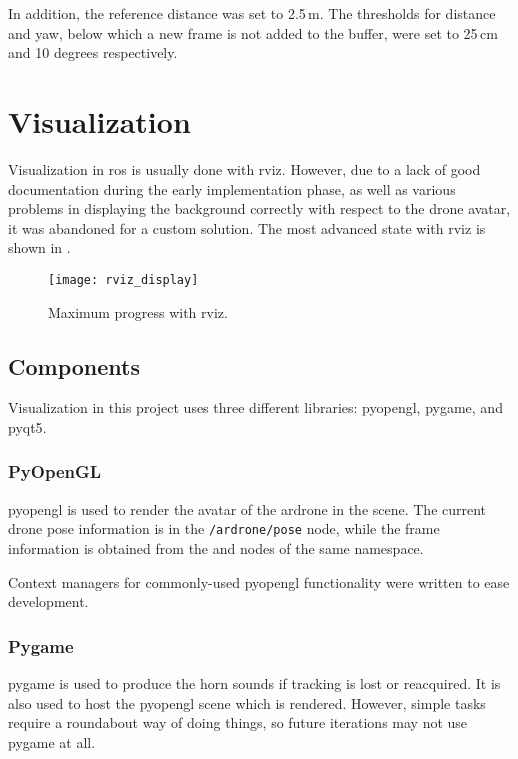      In addition, the reference distance was set to 2.5\,m.
      The thresholds for distance and yaw, below which a new frame is not added to the buffer, were set to 25\,cm and 10 degrees respectively.

\chapter{Visualization}
  Visualization in \gls{ros} is usually done with \gls{rviz}.
  However, due to a lack of good documentation during the early implementation phase, as well as various problems in displaying the background correctly with respect to the drone avatar, it was abandoned for a custom solution.
  The most advanced state with \gls{rviz} is shown in .

  \begin{figure}[h]
    \centering
    \texttt{[image: rviz\_display]}
    \caption[rviz maximum progress]{Maximum progress with \gls{rviz}.}
    \label{fig:rviz_display}
  \end{figure}

  \section{Components}
    Visualization in this project uses three different libraries: \gls{pyopengl}, \gls{pygame}, and \gls{pyqt5}.

    \subsection{PyOpenGL}
    \gls{pyopengl} is used to render the avatar of the \gls{ardrone} in the scene.
    The current drone pose information is in the \texttt{/ardrone/pose} node, while the frame information is obtained from the \texttt{} and \texttt{} nodes of the same namespace.

    Context managers for commonly-used \gls{pyopengl} functionality were written to ease development.
    
    \subsection{Pygame}
    \gls{pygame} is used to produce the horn sounds if tracking is lost or reacquired.
    It is also used to host the \gls{pyopengl} scene which is rendered.
    However, simple tasks require a roundabout way of doing things, so future iterations may not use \gls{pygame} at all.


